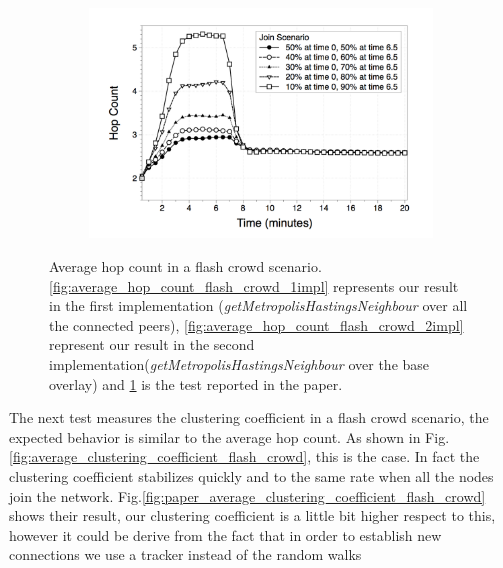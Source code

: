 \begin{figure}
\begin{subfigure}{.5\textwidth}
  \includegraphics[keepaspectratio=true, width=1\linewidth]{images/paper_average_hop_count_flash_crowd}
  \caption{}
  \label{fig:paper_average_hop_count_flash_crowd}
\end{subfigure}
\caption{Average hop count in a flash crowd scenario. \ref{fig:average_hop_count_flash_crowd_1impl} represents our result in the first implementation (\textit{getMetropolisHastingsNeighbour} over all the connected peers), \ref{fig:average_hop_count_flash_crowd_2impl} represent our result in the second implementation(\textit{getMetropolisHastingsNeighbour} over the base overlay) and \ref{fig:paper_average_hop_count_flash_crowd} is the test reported in the paper.}
\label{fig:robustness_hop_count_flash_crowd}
\end{figure}

The next test measures the clustering coefficient in a flash crowd scenario, the expected behavior is similar to the average hop count. As shown in Fig.\ref{fig:average_clustering_coefficient_flash_crowd}, this is the case. In fact the clustering coefficient stabilizes quickly and to the same rate when all the nodes join the network. Fig.\ref{fig:paper_average_clustering_coefficient_flash_crowd} shows their result, our clustering coefficient is a little bit higher respect to this, however it could be derive from the fact that in order to establish new connections we use a tracker instead of the random walks

